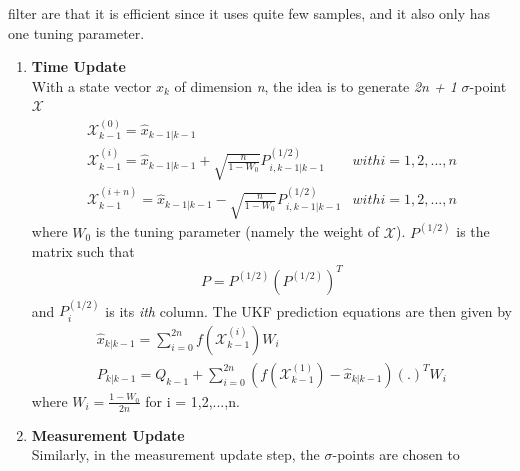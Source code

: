 \begin{itemize}
                        filter are that it is efficient since it uses quite few samples, and it also only has one tuning parameter.
                            \begin{enumerate}
                                \item \textbf{Time Update} \\ 
                                    \vspace{3mm}
                                    With a state vector \emph{$x_k$} of dimension \emph{n}, the idea is to generate \emph{2n + 1} $\sigma$-point $\mathcal{X}$
                                    \begin{align}
                                        \mathcal{X}_{k-1}^{(0)} = \hat{x}_{k-1|k-1} \\
                                        \mathcal{X}_{k-1}^{(i)} = \hat{x}_{k-1|k-1} + \sqrt{\frac{n}{1-W_0}} P_{i,k-1|k-1}^{(1/2)} & with i = 1,2,...,n \\
                                        \mathcal{X}_{k-1}^{(i+n)} = \hat{x}_{k-1|k-1} - \sqrt{\frac{n}{1-W_0}} P_{i,k-1|k-1}^{(1/2)} & with i = 1,2,...,n 
                                    \end{align}
                                    where \emph{$W_0$} is the tuning parameter (namely the weight of $\mathcal{X}$). \textbf{$P^{(1/2)}$} is the matrix such that
                                    \begin{align}
                                        P = P^{(1/2)} (P^{(1/2)})^T
                                    \end{align}
                                    and \emph{$P_i^(1/2)$} is its \emph{ith} column. The UKF prediction equations are then given by
                                    \begin{align}
                                        \hat{x}_{k|k-1} = \displaystyle\sum_{i=0}^{2n} f(\mathcal{X}_{k-1}^{(i)}) W_i \\
                                        P_{k|k-1} = Q_{k-1} + \displaystyle\sum_{i=0}^{2n} (f(\mathcal{X}_{k-1}^{(1)}) - \hat{x}_{k|k-1}) (.)^T W_i
                                    \end{align} 
                                    where $W_i = \frac{1-W_0}{2n}$ for i = 1,2,...,n.
                                \item \textbf{Measurement Update} \\ 
                                    Similarly, in the measurement update step, the $\sigma$-points are chosen to 

\end{enumerate}
\end{itemize}
